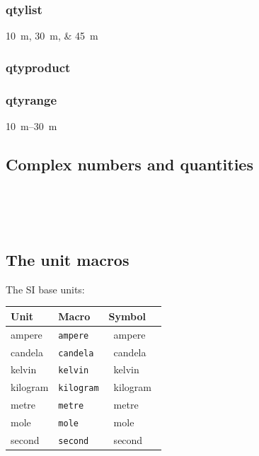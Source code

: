 \documentclass{article}
\def\Backslash{\copy\slashbox}
\begin{document}
\subsubsection{qtylist}
\qtylist{10;30;45}{\metre}

\subsubsection{qtyproduct}

\subsubsection{qtyrange}
\qtyrange{10}{30}{\metre}


\subsection{Complex numbers and quantities}

\\
\\
\\

\subsection{The unit macros}
\newcommand{\showunit}[1]{#1 & \texttt{\Backslash#1} & \unit{\csname#1\endcsname}}

The SI base units:
\begin{center}
\begin{tabular}{lll}\toprule
Unit & Macro & Symbol \\\midrule
\showunit{ampere}\\
\showunit{candela}\\
\showunit{kelvin}\\
\showunit{kilogram}\\
\showunit{metre}\\
\showunit{mole}\\
\showunit{second}\\\bottomrule
\end{tabular}
\end{center}
\end{document}
